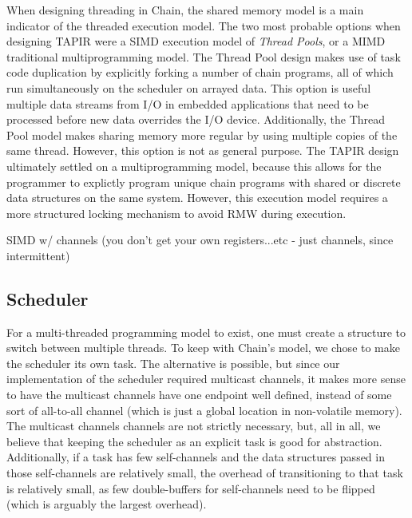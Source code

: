 \documentclass[11pt]{sensys-proc}
\newcommand{\chain}{Chain\xspace}
\begin{document}
When designing threading in Chain, the shared memory model is a main indicator 
of the threaded execution model. The two most probable options when designing 
TAPIR were a SIMD execution model of \textit{Thread Pools}, or a MIMD 
traditional multiprogramming model. The Thread Pool design makes use of task 
code duplication by explicitly forking a number of chain programs, all of which 
run simultaneously on the scheduler on arrayed data. This option is useful 
multiple data streams from I/O in embedded applications that need to be 
processed before new data overrides the I/O device. Additionally, the Thread 
Pool model makes sharing memory more regular by using multiple copies of the 
same thread. However, this option is not as general purpose. The TAPIR design 
ultimately settled on a multiprogramming model, because this allows for the 
programmer to explictly program unique chain programs with shared or discrete 
data structures on the same system. However, this execution model requires a
more structured locking mechanism to avoid RMW during execution. 

SIMD w/ channels (you don't get your own registers...etc -
    just channels, since intermittent)\\


\subsection{Scheduler}
For a multi-threaded programming model to exist, one must create a structure to
switch between multiple threads. To keep with \chain's model, we chose to make
the scheduler its own task. The alternative is possible, but since our
implementation of the scheduler required multicast channels, it makes more
sense to have the multicast channels have one endpoint well defined, instead of
some sort of all-to-all channel (which is just a global location in
non-volatile memory). The multicast channels channels are not strictly
necessary, but, all in all, we believe that keeping the scheduler as an
explicit task is good for abstraction. Additionally, if a task has few
self-channels and the data structures passed in those self-channels are
relatively small, the overhead of transitioning to that task is relatively
small, as few double-buffers for self-channels need to be flipped (which is
arguably the largest overhead).
\end{document}
